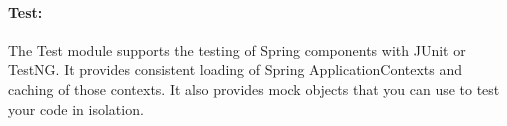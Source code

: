 \paragraph{Test:} The Test module supports the testing of Spring components with JUnit or TestNG. It provides consistent
loading of Spring ApplicationContexts and caching of those contexts. It also provides mock objects that
you can use to test your code in isolation.




